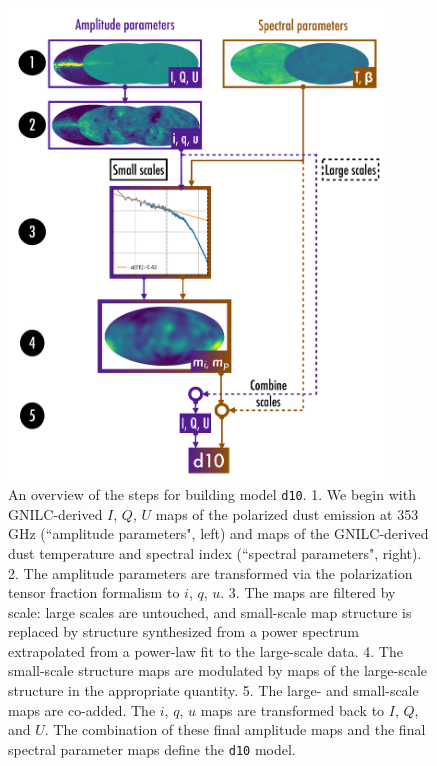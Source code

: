 \documentclass[twocolumn]{aastex631}
\begin{document}
\begin{figure}
    \includegraphics[width=0.9\textwidth]{figures/draft_flowchart_fig_larger_scalesep.pdf}
    \caption{An overview of the steps for building model \texttt{d10}. 1. We begin with GNILC-derived $I$, $Q$, $U$ maps of the polarized dust emission at 353 GHz (``amplitude parameters", left) and maps of the GNILC-derived dust temperature and spectral index (``spectral parameters", right). 2. The amplitude parameters are transformed via the polarization tensor fraction formalism to $i$, $q$, $u$. 3. The maps are filtered by scale: large scales are untouched, and small-scale map structure is replaced by structure synthesized from a power spectrum extrapolated from a power-law fit to the large-scale data. 4. The small-scale structure maps are modulated by maps of the large-scale structure in the appropriate quantity. 5. The large- and small-scale maps are co-added. The $i$, $q$, $u$ maps are transformed back to $I$, $Q$, and $U$. The combination of these final amplitude maps and the final spectral parameter maps define the \texttt{d10} model.   }
    \label{fig:flowchart}
\end{figure}
\end{document}
